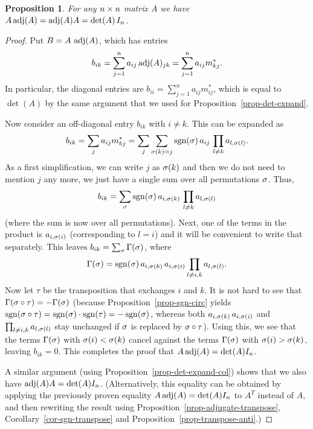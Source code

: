 \documentclass[reqno]{amsart}
\newtheorem{proposition}[theorem]{Proposition}
\theoremstyle{definition}
\begin{document}
\begin{proposition}\label{prop-adjugate}
 For any $n\times n$ matrix $A$ we have $A\operatorname{adj}(A)=\operatorname{adj}(A)A=\det(A)\,I_n$.
\end{proposition}
\begin{proof}
 Put $B=A\,\operatorname{adj}(A)$, which has entries
 \[ b_{ik}=\sum_{j=1}^n a_{ij}\operatorname{adj}(A)_{jk}=\sum_{j=1}^na_{ij}m^*_{kj}. \]
 In particular, the diagonal entries are
 $b_{ii}=\sum_{j=1}^na_{ij}m^*_{ij}$, which is equal to $\det(A)$ by
 the same argument that we used for Proposition~\ref{prop-det-expand}.

 Now consider an off-diagonal entry $b_{ik}$ with $i\neq k$.  This can
 be expanded as
 \[ b_{ik} = \sum_j a_{ij}m^*_{kj} =
     \sum_j \sum_{\sigma(k)=j} \operatorname{sgn}(\sigma)\,a_{ij}\, \prod_{l\neq k} a_{l,\sigma(l)}.
 \]
 As a first simplification, we can write $j$ as $\sigma(k)$ and then we
 do not need to mention $j$ any more, we just have a single sum over
 all permutations $\sigma$.  Thus,
 \[ b_{ik} =
     \sum_{\sigma} \operatorname{sgn}(\sigma)\,a_{i,\sigma(k)}\, \prod_{l\neq k} a_{l,\sigma(l)}
 \]
 (where the sum is now over all permutations).
 Next, one of the terms in the product is
 $a_{i,\sigma(i)}$ (corresponding to $l=i$) and it will be convenient to
 write that separately.  This leaves $b_{ik}=\sum_\sigma\Gamma(\sigma)$, where
 \[ \Gamma(\sigma) =  \operatorname{sgn}(\sigma)\,a_{i,\sigma(k)}\,a_{i,\sigma(i)}
      \prod_{l\neq i,k} a_{l,\sigma(l)}.
 \]
 Now let $\tau$ be the transposition that exchanges $i$ and $k$.   It
 is not hard to see that $\Gamma(\sigma\circ\tau)=-\Gamma(\sigma)$
 (because Proposition~\ref{prop-sgn-circ} yields
 $\operatorname{sgn}(\sigma\circ\tau) = \operatorname{sgn}(\sigma) \cdot \operatorname{sgn}(\tau) = -\operatorname{sgn}(\sigma)$,
 whereas both $a_{i,\sigma(k)}\,a_{i,\sigma(i)}$ and
 $\prod_{l\neq i,k} a_{l,\sigma(l)}$ stay unchanged if $\sigma$
 is replaced by $\sigma\circ\tau$).  Using this, we
 see that the terms $\Gamma(\sigma)$ with $\sigma(i)<\sigma(k)$ cancel against the
 terms $\Gamma(\sigma)$ with $\sigma(i)>\sigma(k)$, leaving $b_{ik}=0$.  This
 completes the proof that $A\operatorname{adj}(A)=\det(A) I_n$.

 A similar argument (using Proposition~\ref{prop-det-expand-col})
 shows that we also have $\operatorname{adj}(A)A=\det(A)I_n$.
 (Alternatively, this equality can be obtained by applying the
 previously proven equality $A\operatorname{adj}(A)=\det(A) I_n$ to $A^T$ instead
 of $A$, and then rewriting the result using
 Proposition~\ref{prop-adjugate-transpose},
 Corollary~\ref{cor-sgn-transpose} and Proposition~\ref{prop-transpose-anti}.)
\end{proof}
\end{document}
